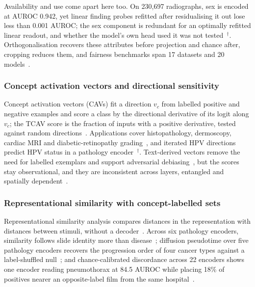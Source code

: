 Availability and use come apart here too. On 230,697 radiographs, sex is encoded at AUROC 0.942, yet
linear finding probes refitted after residualising it out lose less than 0.001 AUROC; the sex component
is redundant for an optimally refitted linear readout, and whether the model's own head used it was not
tested~\cite{kim2026encoding}$^{\dagger}$. Orthogonalisation recovers these attributes before projection
and chance after, cropping reduces them, and fairness benchmarks span 17 datasets and 20
models~\cite{weber2023posthoc,sutariya2026impact,jin2024fairmedfm,kauffmann2024explainable}.

\subsubsection{Concept activation vectors and directional sensitivity}

Concept activation vectors (CAVs) fit a direction $v_c$ from labelled positive and negative examples and
score a class by the directional derivative of its logit along $v_c$; the TCAV score is the fraction of
inputs with a positive derivative, tested against random directions~\cite{kim2018interpretability}.
Applications cover histopathology, dermoscopy, cardiac MRI and diabetic-retinopathy
grading~\cite{graziani2018regression,graziani2020concept,lucieri2020interpretability,clough2019global,stors2024looking},
and iterated HPV directions predict HPV status in a pathology
encoder~\cite{hieromnimon2025analysis}$^{\dagger}$. Text-derived vectors remove the need for labelled
exemplars and support adversarial debiasing~\cite{nicolson2024textcavs,correa2023efficient}, but the
scores stay observational, and they are inconsistent across layers, entangled and spatially
dependent~\cite{nicolson2024explaining}.

\subsubsection{Representational similarity with concept-labelled sets}

Representational similarity analysis compares distances in the representation with distances between
stimuli, without a decoder~\cite{kriegeskorte2008representational}. Across six pathology encoders,
similarity follows slide identity more than disease~\cite{mishra2025comparing}; diffusion pseudotime over
five pathology encoders recovers the progression order of four cancer types against a label-shuffled
null~\cite{vig2026do}; and chance-calibrated discordance across 22 encoders shows one encoder reading
pneumothorax at 84.5 AUROC while placing 18\% of positives nearer an opposite-label film from the same
hospital~\cite{arasteh2026candor}.

